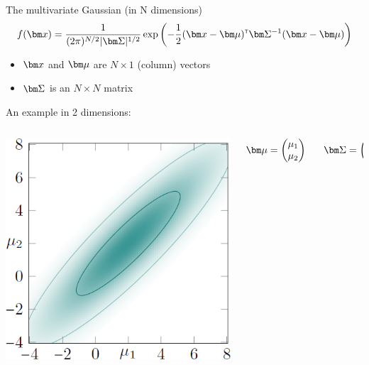 \begin{frame}
\begin{block}{The multivariate Gaussian (in N dimensions)}
\[f(\bx) = \frac{1}{(2\pi)^{N/2}|\bSigma|^{1/2}} \exp \left(-\frac{1}{2} (\bx-\bmu)\transpose \bSigma\inv (\bx-\bmu) \right)\]
\begin{itemize}
\item $\bx$ and $\bmu$ are $N\times 1$ (column) vectors
\item $\bSigma$ is an $N\times N$ matrix
\end{itemize}
\end{block}

An example in 2 dimensions:
\begin{columns}[T]
\begin{column}{.3\textwidth}
\includegraphics[width=\textwidth]{images/plots/Gaussian-2d.png}
\end{column}
\begin{column}{.5\textwidth}
\vspace*{1cm}
$\bmu =
\begin{pmatrix}
\mu_1\\
\mu_2
\end{pmatrix}
\;\;\;\;\;\;
\bSigma = 
\begin{pmatrix}
\sigma^2_{11}\;\;\sigma^2_{12}\\
\sigma^2_{21}\;\;\sigma^2_{22}\\
\end{pmatrix}
$
\end{column}

\end{columns}
\end{frame}

